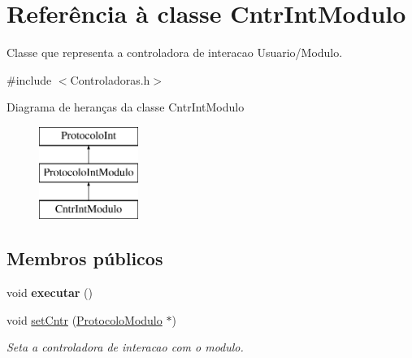 \hypertarget{class_cntr_int_modulo}{
\section{\-Referência à classe \-Cntr\-Int\-Modulo}
\label{class_cntr_int_modulo}
}


\-Classe que representa a controladora de interacao \-Usuario/\-Modulo.  




{\ttfamily \#include $<$\-Controladoras.\-h$>$}

\-Diagrama de heranças da classe \-Cntr\-Int\-Modulo\begin{figure}[H]
\begin{center}
\leavevmode
\includegraphics[height=3.000000cm]{class_cntr_int_modulo}
\end{center}
\end{figure}
\subsection*{\-Membros públicos}
\begin{DoxyCompactItemize}
\item 
\hypertarget{class_cntr_int_modulo_a7c6fb782e81f2585cc5c45b3416eca9e}{
void {\bfseries executar} ()}
\label{class_cntr_int_modulo_a7c6fb782e81f2585cc5c45b3416eca9e}

\item 
void \hyperlink{class_cntr_int_modulo_a4233eefb24e6578b004bfe5d00bad190}{set\-Cntr} (\hyperlink{class_protocolo_modulo}{\-Protocolo\-Modulo} $\ast$)
\begin{DoxyCompactList}\small\item\em \-Seta a controladora de interacao com o modulo. \end{DoxyCompactList}\end{DoxyCompactItemize}
